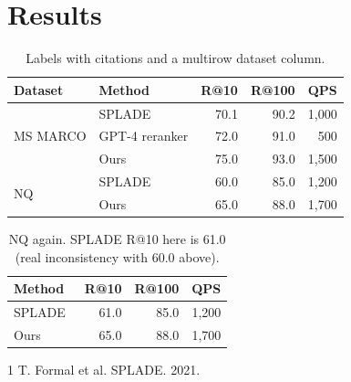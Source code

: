 \documentclass{article}
\begin{document}
\section{Results}
\begin{table}[h]\centering\caption{Labels with citations and a multirow dataset column.}\label{tab:a}
\begin{tabular}{llrrr}
\toprule
Dataset & Method & R@10 & R@100 & QPS \\
\midrule
\multirow{3}{*}{MS MARCO} & SPLADE~\cite{formal2021} & 70.1 & 90.2 & 1,000 \\
 & GPT-4 reranker & 72.0 & 91.0 & 500 \\
 & Ours & 75.0 & 93.0 & 1,500 \\
\midrule
\multirow{2}{*}{NQ} & SPLADE~\cite{formal2021} & 60.0 & 85.0 & 1,200 \\
 & Ours & 65.0 & 88.0 & 1,700 \\
\bottomrule
\end{tabular}\end{table}
\begin{table}[h]\centering\caption{NQ again. SPLADE R@10 here is 61.0 (real inconsistency with 60.0 above).}\label{tab:b}
\begin{tabular}{lrrr}
\toprule
Method & R@10 & R@100 & QPS \\
\midrule
SPLADE~\cite{formal2021} & 61.0 & 85.0 & 1,200 \\
Ours & 65.0 & 88.0 & 1,700 \\
\bottomrule
\end{tabular}\end{table}
\begin{thebibliography}{1}
 T. Formal et al. SPLADE. 2021.
\end{thebibliography}
\end{document}
